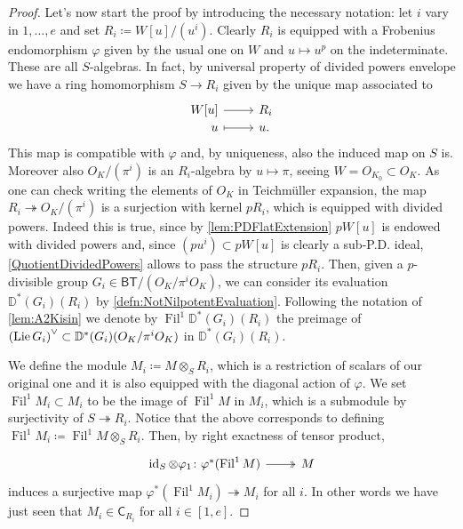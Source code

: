 \begin{proof}
Let's now start the proof by introducing the necessary notation:
let $i$ vary in $1, \ldots, e$ and set $R_i \coloneqq W[u]/ (u^i)$.
Clearly $R_i$ is equipped with a Frobenius endomorphism $\varphi$
given by the usual one on $W$ and $u \mapsto u^p$ on the indeterminate.
These are all $S$-algebras.
In fact, by universal property of divided powers envelope
we have a ring homomorphism $S \to R_i$ given by the unique map associated to
\begin{equation*}
\begin{tikzcd}[row sep = 0ex
	,/tikz/column 1/.append style={anchor=base east}
	,/tikz/column 2/.append style={anchor=base west}]
	W[u] \arrow[r, "", rightarrow] &
	R_i \\
	u \arrow[r, "", mapsto] & u.
\end{tikzcd}
\end{equation*} 
This map is compatible with $\varphi$ and, by uniqueness, also
the induced map on $S$ is.
Moreover also $O_K/ (\pi^i)$ is an $R_i$-algebra by $u \mapsto \pi$,
seeing $W = O_{K_0} \subset O_K$.
As one can check writing the elements of $O_K$ in Teichmüller expansion,
the map $R_i \twoheadrightarrow O_K/ (\pi^i)$ is a surjection
with kernel $pR_i$, which is equipped with divided powers.
Indeed this is true, since by \cref{lem:PDFlatExtension} \(pW[u]\) is endowed
with divided powers and, since \((pu^i) \subset pW[u]\) is clearly
a sub-P.D. ideal, \cref{QuotientDividedPowers} allows to pass the structure \(pR_i\).
Then, given a $p$-divisible group $G_i \in \mathsf{BT}/ (O_K/ \pi^iO_K)$,
we can consider its evaluation $\mathbb{D}^*(G_i)(R_i)$ by \cref{defn:NotNilpotentEvaluation}.
Following the notation of \cref{lem:A2Kisin}
we denote by $\operatorname{Fil}^1\mathbb{D}^*(G_i)(R_i)$
the preimage of $\left( \operatorname{Lie} G_i \right)^\vee \subset \mathbb{D}^*(G_i)(O_K/\pi^iO_K)$
in $\mathbb{D}^*(G_i)(R_i)$.

We define the module $M_i \coloneqq M \otimes_S R_i$,
which is a restriction of scalars of our original one and
it is also equipped with the diagonal action of $\varphi$.
We set $\operatorname{Fil}^1 M_i \subset M_i$
to be the image of $\operatorname{Fil}^1 M$ in $M_i$, which is a submodule
by surjectivity of $S \twoheadrightarrow R_i$.
Notice that the above corresponds to defining $\operatorname{Fil}^1 M_i \coloneqq
\operatorname{Fil}^1 M \otimes_S R_i$.
Then, by right exactness of tensor product, 
\begin{equation*}
\begin{tikzcd}[row sep = 0ex
	,/tikz/column 1/.append style={anchor=base east}
	,/tikz/column 2/.append style={anchor=base west}]
	\id_{ S } \otimes \varphi_1
	\colon 
	\varphi^*(\operatorname{Fil}^1 M)
	\arrow[r, "", twoheadrightarrow] &
	M
\end{tikzcd}
\end{equation*} 
induces a surjective map $\varphi^*(\operatorname{Fil}^1 M_i) \twoheadrightarrow M_i$
for all $i$.
In other words we have just seen that
$M_i \in \mathsf{C}_{R_i}$ for all $i \in [1,e]$.


\end{proof}

